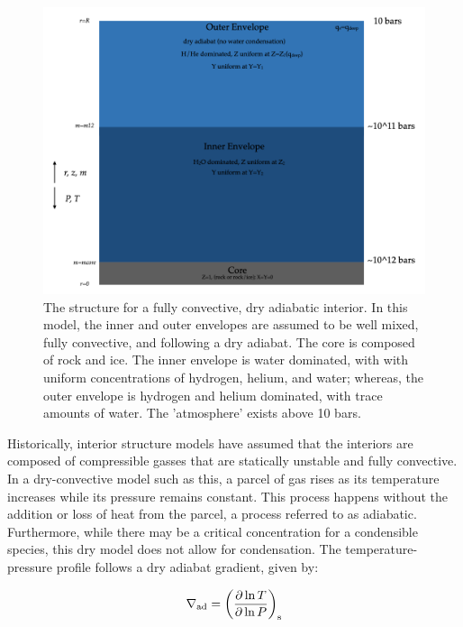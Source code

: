 \documentclass[11pt]{ucscthesisbs}
\begin{document}
\begin{figure}[ht!]
 \centerline{
  \includegraphics[width=6.0in]{figures/structure_schematic_images/structure_schematic_images.001.png}
 }
\caption[A Standard Interior Structure Model]
{The structure for a fully convective, dry adiabatic interior. In this model, the inner and outer envelopes are assumed to be well mixed, fully convective, and following a dry adiabat. The core is composed of rock and ice. The inner envelope is water dominated, with with uniform concentrations of hydrogen, helium, and water; whereas, the outer envelope is hydrogen and helium dominated, with trace amounts of water. The 'atmosphere' exists above 10 bars.}
\label{fig:standard_dry_interior}
\end{figure}

Historically, interior structure models have assumed that the interiors are composed of compressible gasses that are statically unstable and fully convective. In a dry-convective model such as this, a parcel of gas rises as its temperature increases while its pressure remains constant. This process happens without the addition or loss of heat from the parcel, a process referred to as adiabatic. Furthermore, while there may be a critical concentration for a condensible species, this dry model does not allow for condensation. The temperature-pressure profile follows a dry adiabat gradient\citep{kippenhahn_2012}, given by:

\begin{equation}
  \nabla_{\rm ad} = \left( \frac{\partial \ln T}{\partial \ln P} \right)_{\rm s}
\end{equation}
\end{document}
